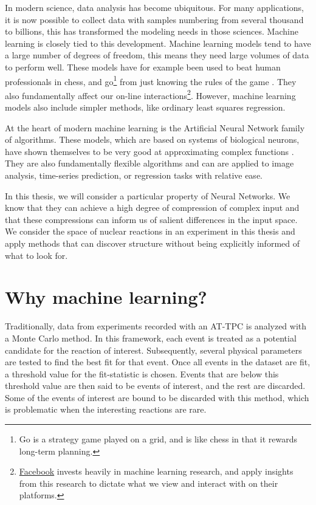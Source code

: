 In modern science, data analysis has become ubiquitous. For many applications, it is now possible to collect data with samples numbering from several thousand to billions, this has transformed the modeling needs in those sciences. Machine learning is closely tied to this development. Machine learning models tend to have a large number of degrees of freedom, this means they need large volumes of data to perform well. These models have for example been used to beat human professionals in chess, and go\footnote{Go is a strategy game played on a grid, and is like chess in that it rewards long-term planning.} from just knowing the rules of the game \cite{Silver2018}. They also fundamentally affect our on-line interactions\footnote{\href{https://research.fb.com/category/machine-learning/}{Facebook} invests heavily in machine learning research, and apply insights from this research to dictate what we view and interact with on their platforms.}. However, machine learning models also include simpler methods, like ordinary least squares regression. 

At the heart of modern machine learning is the Artificial Neural Network family of algorithms. These models, which are based on systems of biological neurons, have shown themselves to be very good at approximating complex functions \cite{Lin2017}. They are also fundamentally flexible algorithms and can are applied to image analysis, time-series prediction, or regression tasks with relative ease.

In this thesis, we will consider a particular property of Neural Networks. We know that they can achieve a high degree of compression of complex input and that these compressions can inform us of salient differences in the input space. We consider the space of nuclear reactions in an experiment in this thesis and apply methods that can discover structure without being explicitly informed of what to look for.

\section{Why machine learning?}

Traditionally, data from experiments recorded with an AT-TPC is analyzed with a Monte Carlo method. In this framework, each event is treated as a potential candidate for the reaction of interest. Subsequently, several physical parameters are tested to find the best fit for that event. Once all events in the dataset are fit, a threshold value for the fit-statistic is chosen. Events that are below this threshold value are then said to be events of interest, and the rest are discarded. Some of the events of interest are bound to be discarded with this method, which is problematic when the interesting reactions are rare. 

